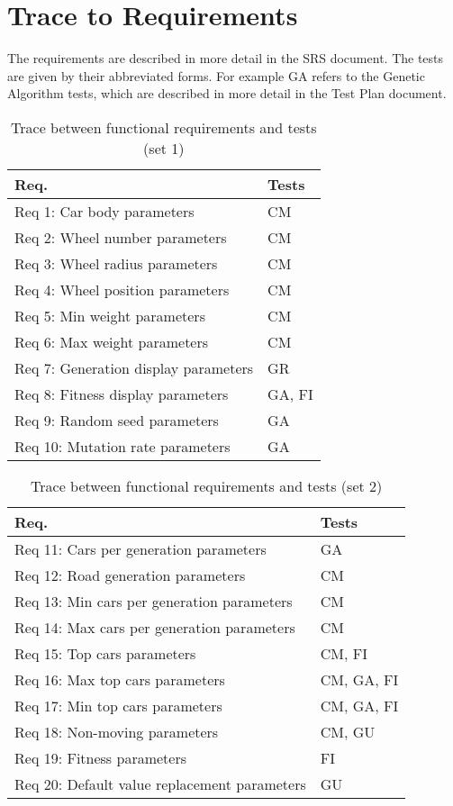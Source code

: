 \documentclass[12pt, titlepage]{article}
\begin{document}
\section{Trace to Requirements}

The requirements are described in more detail in the SRS document. The tests are given by their abbreviated forms. For example GA refers to the Genetic Algorithm tests, which are described in more detail in the Test Plan document.
		
\begin{table}[H]
\centering
\begin{tabular}{p{} p{}}
\toprule
\textbf{Req.} & \textbf{Tests}\\
\midrule
Req 1: Car body parameters & CM \\
Req 2: Wheel number parameters & CM \\
Req 3: Wheel radius parameters & CM\\
Req 4: Wheel position parameters & CM\\
Req 5: Min weight parameters & CM\\
Req 6: Max weight parameters & CM\\
Req 7: Generation display parameters & GR\\
Req 8: Fitness display parameters & GA, FI\\
Req 9: Random seed parameters & GA\\
Req 10: Mutation rate parameters & GA\\
\bottomrule
\end{tabular}
\caption{Trace between functional requirements and tests (set 1)}
\label{TblRT}
\end{table}

\begin{table}[H]
\centering
\begin{tabular}{p{} p{}}
\toprule
\textbf{Req.} & \textbf{Tests}\\
\midrule
Req 11: Cars per generation parameters  & GA\\
Req 12: Road generation parameters & CM\\
Req 13: Min cars per generation parameters & CM\\
Req 14: Max cars per generation parameters & CM\\
Req 15: Top cars parameters & CM, FI\\
Req 16: Max top cars parameters & CM, GA, FI\\
Req 17: Min top cars parameters & CM, GA, FI\\
Req 18: Non-moving parameters & CM, GU\\
Req 19: Fitness parameters & FI\\
Req 20: Default value replacement parameters & GU\\
\bottomrule
\end{tabular}
\caption{Trace between functional requirements and tests (set 2)}
\label{TblRT2}
\end{table}
\end{document}

